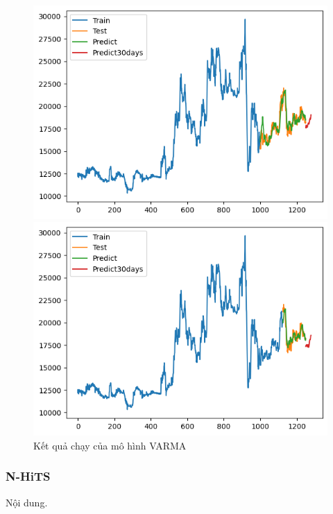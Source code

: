 \begin{figure}[H]
\begin{minipage}{0.15\textwidth}
    \includegraphics[width=1\textwidth]{resources/chapter-5/result/EIB_NBeats_8-2.png}
    \end{minipage}
    \hfill
        \begin{minipage}{0.15\textwidth}
    \centering
    \includegraphics[width=1\textwidth]{resources/chapter-5/result/EIB_NBeats_9-1.png}
    \end{minipage}
    \hfill
    
    \caption{Kết quả chạy của mô hình VARMA}
    \label{fig:N-BEATS}
\end{figure}

\subsubsection{N-HiTS}
Nội dung.

